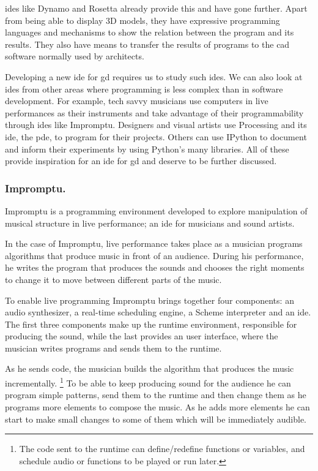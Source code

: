 \documentclass{./llncs2e/llncs}
\begin{document}
	\ac{ide}s like Dynamo\cite{dynamo2015site} and Rosetta\cite{de2012modern} already provide this and have gone further.
	Apart from being able to display 3D models, they have expressive programming languages and mechanisms to show the relation between the program and its results.
	They also have means to transfer the results of programs to the \ac{cad} software normally used by architects.
	
	Developing a new \ac{ide} for \ac{gd} requires us to study such \ac{ide}s.
	We can also look at \acp{ide} from other areas where programming is less complex than in software development.
	For example, tech savvy musicians use computers in live performances as their instruments and take advantage of their programmability through \ac{ide}s like Impromptu.
	Designers and visual artists use Processing and its \ac{ide}, the \ac{pde}, to program for their projects.
	Others can use IPython to document and inform their experiments by using Python's many libraries.
	All of these provide inspiration for an \ac{ide} for \ac{gd} and deserve to be further discussed.
	
\subsubsection{Impromptu.}
	Impromptu\cite{sorensen2005impromptu,sorensen2010programming} is a programming environment developed to explore manipulation of musical structure in live performance; an \ac{ide} for musicians and sound artists.
	
	In the case of Impromptu, live performance takes place as a musician programs algorithms that produce music in front of an audience.
	During his performance, he writes the program that produces the sounds and chooses the right moments to change it to move between different parts of the music.
	
	To enable live programming Impromptu brings together four components: an audio synthesizer, a real-time scheduling engine, a Scheme interpreter and an \ac{ide}. 
	The first three components make up the runtime environment, responsible for producing the sound, while the last provides an user interface, where the musician writes programs and sends them to the runtime. 
	
	As he sends code, the musician builds the algorithm that produces the music incrementally.
	\footnote{The code sent to the runtime can define/redefine functions or variables, and schedule audio or functions to be played or run later.}
	To be able to keep producing sound for the audience he can program simple patterns, send them to the runtime and then change them as he programs more elements to compose the music.
	As he adds more elements he can start to make small changes to some of them which will be immediately audible.
	
\end{document}
